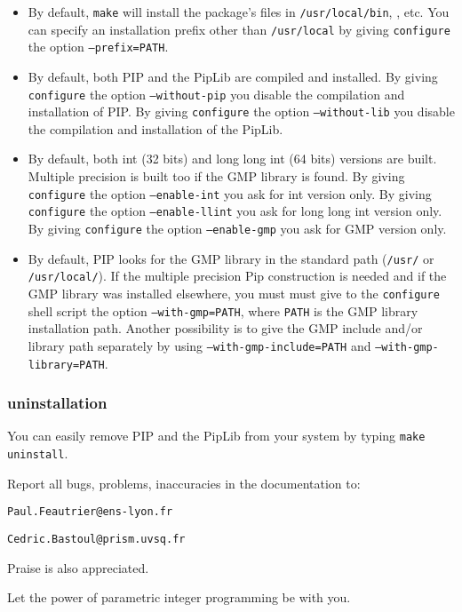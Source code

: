 \documentclass[12pt,a4paper,dvips]{article}
\begin{document}
\begin{itemize}
\item By default, {\tt make} will install the package's files in
{\tt /usr/local/bin}, , etc. You can specify an
installation prefix other than {\tt /usr/local} by giving {\tt configure} the
option {\tt --prefix=PATH}.

\item By default, both PIP and the PipLib are compiled and installed. By giving
{\tt configure} the option {\tt --without-pip} you disable the compilation and
installation of PIP. By giving {\tt configure} the option {\tt --without-lib}
you disable the compilation and installation of the PipLib.

\item By default, both int (32 bits) and long long int (64 bits) versions are
built. Multiple precision is built too if the GMP library is found.
By giving {\tt configure} the option {\tt --enable-int} you ask for int
version only. By giving {\tt configure} the option {\tt --enable-llint} you
ask for long long int version only. By giving {\tt configure} the
option {\tt --enable-gmp} you ask for GMP version only.

\item By default, PIP looks for the GMP library in the standard path
({\tt /usr/} or {\tt /usr/local/}). If the multiple precision Pip construction
is needed and if the GMP library was installed elsewhere, you must must give
to the {\tt configure} shell script the option {\tt --with-gmp=PATH}, where
{\tt PATH} is the GMP library installation path. Another possibility is to
give the GMP include and/or library path separately by using 
{\tt --with-gmp-include=PATH} and {\tt --with-gmp-library=PATH}.
\end{itemize}

\subsubsection{uninstallation}
You can easily remove PIP and the PipLib from your system by typing
{\tt make uninstall}.

\vspace{0.5cm}
Report all bugs, problems, inaccuracies in the documentation to:

{\tt Paul.Feautrier@ens-lyon.fr}

{\tt Cedric.Bastoul@prism.uvsq.fr}

Praise is also appreciated.

Let the power of parametric integer programming be with you.


\end{document}
